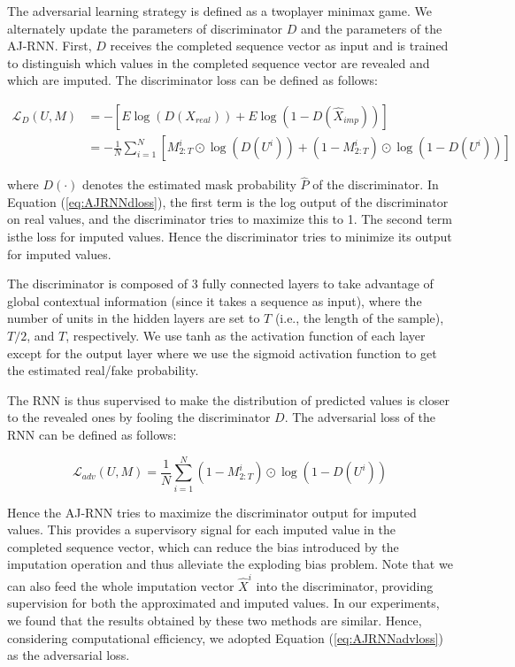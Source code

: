 The adversarial learning strategy is defined as a twoplayer minimax game.
We alternately update the parameters of discriminator $D$ and the parameters of the AJ-RNN.
First, $D$ receives the completed sequence vector as input and is trained to distinguish which values in the completed sequence vector are revealed and which are imputed. 
The discriminator loss can be defined as follows:

\begin{align}
  \mathcal{L}_{D}(U, M) & = - [E \log(D(X_{real})) + E \log(1 - D(\hat{X}_{imp}))] \label{eq:AJRNNdloss} \\ 
                        & = - \frac{1}{N} \sum_{i=1}^N \left[ M^i_{2:T} \odot \log(D(U^i)) + (1 - M^i_{2:T}) \odot \log(1-D(U^i)) \right]
\end{align}

where $D(\cdot)$ denotes the estimated mask probability $\hat{P}$ of the discriminator. 
In Equation (\ref{eq:AJRNNdloss}), the first term is the log output of the discriminator on real values, and the discriminator tries to maximize this to 1.
The second term isthe loss for imputed values.
Hence the discriminator tries to minimize its output for imputed values.

The discriminator is composed of 3 fully connected layers to take advantage of global contextual information (since it takes a sequence as input), where the number of units in the hidden layers are set to $T$ (i.e., the length of the sample), $T/2$, and $T$, respectively.
We use tanh as the activation function of each layer except for the output layer where we use the sigmoid activation function to get the estimated real/fake probability.

The RNN is thus supervised to make the distribution of predicted values is closer to the revealed ones by fooling the discriminator $D$. 
The adversarial loss of the RNN can be defined as follows:

\begin{equation}
  \mathcal{L}_{adv}(U, M) = \frac{1}{N} \sum_{i=1}^N  (1 - M^i_{2:T}) \odot \log(1 - D(U^i))
  \label{eq:AJRNNadvloss}
\end{equation}

Hence the AJ-RNN tries to maximize the discriminator output for imputed values.
This provides a supervisory signal for each imputed value in the completed sequence vector, which can reduce the bias introduced by the imputation operation and thus alleviate the exploding bias problem.
Note that we can also feed the whole imputation vector $\hat{X}^i$ into the discriminator, providing supervision for both the approximated and imputed values. 
In our experiments, we found that the results obtained by these two methods are similar. 
Hence, considering computational efficiency, we adopted Equation (\ref{eq:AJRNNadvloss}) as the adversarial loss.

